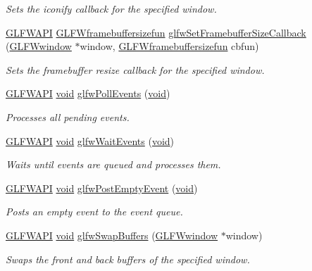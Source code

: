 \begin{DoxyCompactItemize}
\begin{DoxyCompactList}\small\item\em Sets the iconify callback for the specified window. \end{DoxyCompactList}\item 
\hyperlink{glfw3_8h_a56da5036b2cc259351ae22fd6439bb47}{G\+L\+F\+W\+A\+P\+I} \hyperlink{group__window_ga3e218ef9ff826129c55a7d5f6971a285}{G\+L\+F\+Wframebuffersizefun} \hyperlink{group__window_gad766bcdb4465f9c6c62e5d8ca7cfba56}{glfw\+Set\+Framebuffer\+Size\+Callback} (\hyperlink{group__window_ga3c96d80d363e67d13a41b5d1821f3242}{G\+L\+F\+Wwindow} $\ast$window, \hyperlink{group__window_ga3e218ef9ff826129c55a7d5f6971a285}{G\+L\+F\+Wframebuffersizefun} cbfun)
\begin{DoxyCompactList}\small\item\em Sets the framebuffer resize callback for the specified window. \end{DoxyCompactList}\item 
\hyperlink{glfw3_8h_a56da5036b2cc259351ae22fd6439bb47}{G\+L\+F\+W\+A\+P\+I} \hyperlink{wglew_8h_aeea6e3dfae3acf232096f57d2d57f084}{void} \hyperlink{group__window_ga872d16e4c77f58c0436f356255920cfc}{glfw\+Poll\+Events} (\hyperlink{wglew_8h_aeea6e3dfae3acf232096f57d2d57f084}{void})
\begin{DoxyCompactList}\small\item\em Processes all pending events. \end{DoxyCompactList}\item 
\hyperlink{glfw3_8h_a56da5036b2cc259351ae22fd6439bb47}{G\+L\+F\+W\+A\+P\+I} \hyperlink{wglew_8h_aeea6e3dfae3acf232096f57d2d57f084}{void} \hyperlink{group__window_ga6e042d05823c11e11c7339b81a237738}{glfw\+Wait\+Events} (\hyperlink{wglew_8h_aeea6e3dfae3acf232096f57d2d57f084}{void})
\begin{DoxyCompactList}\small\item\em Waits until events are queued and processes them. \end{DoxyCompactList}\item 
\hyperlink{glfw3_8h_a56da5036b2cc259351ae22fd6439bb47}{G\+L\+F\+W\+A\+P\+I} \hyperlink{wglew_8h_aeea6e3dfae3acf232096f57d2d57f084}{void} \hyperlink{group__window_gad6f6b997278c91c43b35970eb9713d7e}{glfw\+Post\+Empty\+Event} (\hyperlink{wglew_8h_aeea6e3dfae3acf232096f57d2d57f084}{void})
\begin{DoxyCompactList}\small\item\em Posts an empty event to the event queue. \end{DoxyCompactList}\item 
\hyperlink{glfw3_8h_a56da5036b2cc259351ae22fd6439bb47}{G\+L\+F\+W\+A\+P\+I} \hyperlink{wglew_8h_aeea6e3dfae3acf232096f57d2d57f084}{void} \hyperlink{group__window_gafb827800eedbfcbc97b1e5408df668d7}{glfw\+Swap\+Buffers} (\hyperlink{group__window_ga3c96d80d363e67d13a41b5d1821f3242}{G\+L\+F\+Wwindow} $\ast$window)
\begin{DoxyCompactList}\small\item\em Swaps the front and back buffers of the specified window. \end{DoxyCompactList}\end{DoxyCompactItemize}


